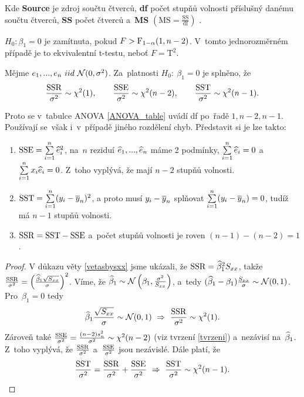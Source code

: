 Kde \textbf{Source} je zdroj součtu čtverců, \textbf{df} počet stupňů volnosti příslušný danému součtu čtverců, \textbf{SS} počet čtverců a~\textbf{MS} $(\mathrm{MS} = \frac{\mathrm{SS}}{\mathrm{df}})$ .
\begin{remark}
	 $H_0:\beta_1 = 0$ je zamítnuta, pokud $F>\mathrm{F}_{1-\alpha}(1,n-2)$. V~tomto jednorozměrném případě je to ekvivalentní t-testu, neboť $F = \mathrm{T}^2$.
\end{remark}
\begin{theorem}
	Mějme $e_1,...,e_n~iid~\mathcal{N}(0,\sigma^2)$. Za~platnosti $H_0:~\beta_1 = 0$ je splněno, že
	 $$ \frac{\mathrm{SSR}}{\sigma^2}\sim\chi^2(1),\qquad\frac{\mathrm{SSE}}{\sigma^2}\sim\chi^2(n-2),\qquad\frac{\mathrm{SST}}{\sigma^2}\sim\chi^2(n-1). $$
\end{theorem}
\begin{remark}
	Proto se v~tabulce ANOVA \ref{ANOVA_table} uvádí df po~řadě $1,n-2,n-1$. Používají se~však i~v~případě jiného rozdělení chyb. Představit si je lze takto:
	\begin{enumerate}
		\item $\mathrm{SSE} = \sum\limits_{i=1}^{n} \widehat{e}_i^2$, na~$n$ reziduí $\widehat{e}_1,...,\widehat{e}_n$ máme 2 podmínky, $\sum\limits_{i=1}^{n} \widehat{e}_i = 0$ a~$\sum\limits_{i=1}^{n} x_i\widehat{e}_i = 0$. Z~toho vyplývá, že mají $n-2$ stupňů volnosti.
		\item $\mathrm{SST} = \sum\limits_{i=1}^{n} (y_i-\overline{y}_n)^2$, a proto musí $y_i-\overline{y}_n$ splňovat $\sum\limits_{i=1}^{n} (y_i-\overline{y}_n) = 0$, tudíž má $n-1$ stupňů volnosti.
		\item $\mathrm{SSR} = \mathrm{SST}-\mathrm{SSE}$ a~počet stupňů volnosti je roven $(n-1)-(n-2) = 1$.
	\end{enumerate}
\begin{proof}
	V důkazu věty \ref{vetasbysxx} jsme ukázali, že $\mathrm{SSR} = \widehat{\beta}_1^2 S_{xx}$, takže $\frac{\mathrm{SSR}}{\sigma^2} = \left(\frac{\widehat{\beta}_1\sqrt{S_{xx}}}{\sigma} \right)^2$. Víme, že $\widehat{\beta}_1\sim\mathcal{N}\left(\beta_1,\frac{\sigma^2}{S_{xx}}\right)$, a~tedy $(\widehat{\beta}_1-\beta_1)\frac{S_{xx}}{\sigma}\sim\mathcal{N}(0,1)$. Pro~$\beta_1 = 0$ tedy $$ \widehat{\beta}_1\frac{\sqrt{S_{xx}}}{\sigma}\sim\mathcal{N}(0,1)~\Rightarrow~\frac{\mathrm{SSR}}{\sigma^2}\sim\chi^2(1). $$
	Zároveň také $\frac{\mathrm{SSE}}{\sigma^2} = \frac{(n-2)s_n^2}{\sigma^2}\sim\chi^2(n-2)$ (viz tvrzení \ref{tvrzeni}) a~nezávisí na~$\widehat{\beta}_1$. Z~toho vyplývá, že $\frac{\mathrm{SSR}}{\sigma^2}$ a~$\frac{\mathrm{SSE}}{\sigma^2}$ jsou nezávislé. Dále platí, že
	 $$ \frac{\mathrm{SST}}{\sigma^2} = \frac{\mathrm{SSR}}{\sigma^2}+\frac{\mathrm{SSE}}{\sigma^2}~\Rightarrow~\frac{\mathrm{SST}}{\sigma^2}\sim\chi^2(n-1). $$
\end{proof}
\end{remark}
